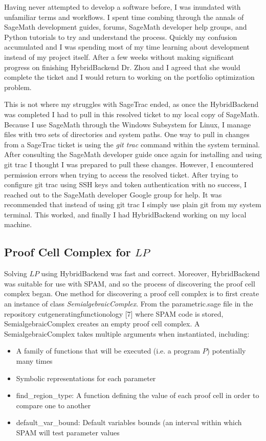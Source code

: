 \documentclass{article}
\begin{document}
Having never attempted to develop a software before, I was inundated with unfamiliar terms and workflows. I spent time combing through the annals of SageMath development guides, forums, SageMath developer help groups, and Python tutorials to try and understand the process. Quickly my confusion accumulated and I was spending most of my time learning about development instead of my project itself. After a few weeks without making significant progress on finishing HybridBackend Dr. Zhou and I agreed that she would complete the ticket and I would return to working on the portfolio optimization problem.

This is not where my struggles with SageTrac ended, as once the HybridBackend was completed I had to pull in this resolved ticket to my local copy of SageMath. Because I use SageMath through the Windows Subsystem for Linux, I manage files with two sets of directories and system paths. One way to pull in changes from a SageTrac ticket is using the \textit{git trac} command within the system terminal. After consulting the SageMath developer guide once again for installing and using git trac I thought I was prepared to pull these changes. However, I encountered permission errors when trying to access the resolved ticket. After trying to configure git trac using SSH keys and token authentication with no success, I reached out to the SageMath developer Google group for help. It was recommended that instead of using git trac I simply use plain git from my system terminal. This worked, and finally I had HybridBackend working on my local machine. 

\subsection{Proof Cell Complex for $LP$}

Solving $LP$ using HybridBackend was fast and correct. Moreover, HybridBackend was suitable for use with SPAM, and so the process of discovering the proof cell complex began. One method for discovering a proof cell complex is to first create an instance of class \textit{SemialgebraicComplex}. From the parametric.sage file in the repository cutgeneratingfunctionology [7] where SPAM code is stored, SemialgebraicComplex creates an empty proof cell complex. A SemialgebraicComplex takes multiple arguments when instantiated, including:

\begin{itemize}
    \item A family of functions that will be executed (i.e. a program $P$) potentially many times
    \item Symbolic representations for each parameter
    \item find\_region\_type: A function defining the value of each proof cell in order to compare one to another
    \item default\_var\_bound: Default variables bounds (an interval within which SPAM will test parameter values
\end{itemize}
\end{document}
